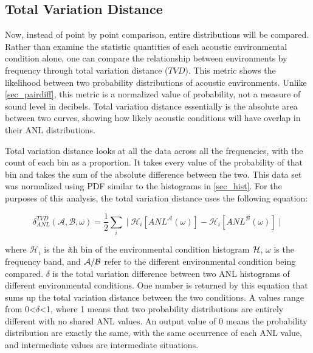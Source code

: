 \subsection{Total Variation Distance} \label{sec_$TVD$}

Now, instead of point by point comparison, entire distributions will be compared. Rather than examine the statistic quantities of each acoustic environmental condition alone, one can compare the relationship between environments by frequency through total variation distance ($TVD$). This metric shows the likelihood between two probability distributions of acoustic environments. Unlike \autoref{sec_pairdiff}, this metric is a normalized value of probability, not a measure of sound level in decibels. Total variation distance essentially is the absolute area between two curves, showing how likely acoustic conditions will have overlap in their ANL distributions. 

 Total variation distance looks at all the data across all the frequencies, with the count of each bin as a proportion. It takes every value of the probability of that bin and takes the sum of the absolute difference between the two. This data set was normalized using PDF similar to the histograms in \autoref{sec_hist}. For the purposes of this analysis, the total variation distance uses the following equation: 


\begin{equation} \label{tdv_eq}
    \delta ^{TVD} _{ANL} ( \mathcal{A}, \mathcal{B}, \omega) = \frac{1}{2} \sum _{i} ^{} \mid \mathcal{H}_{i} [ANL^{\mathcal{A}}(\omega)] -\mathcal{H}_{i} [ANL^{\mathcal{B}}(\omega)] \mid 
\end{equation}

where  $\mathcal{H}_{i}$ is the \textit{i}th bin of the environmental condition histogram $\cal{H}$, $\omega$ is the frequency band, and $\cal{A/B}$ refer to the different environmental condition being compared. $\delta$ is the total variation difference between two ANL histograms of different environmental conditions. One number is returned by this equation that sums up the total variation distance between the two conditions. A values range from 0<$\delta$<1, where 1 means that two probability distributions are entirely different with no shared ANL values. An output value of 0 means the probability distribution are exactly the same, with the same occurrence of each ANL value, and intermediate values are intermediate situations.

